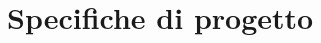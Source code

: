 \documentclass[../main.tex]{subfiles}
\begin{document}
\clearpage
\thispagestyle{empty}
\vspace*{7cm}
\section{Specifiche di progetto}
\vspace*{1.5cm}
\end{document}
